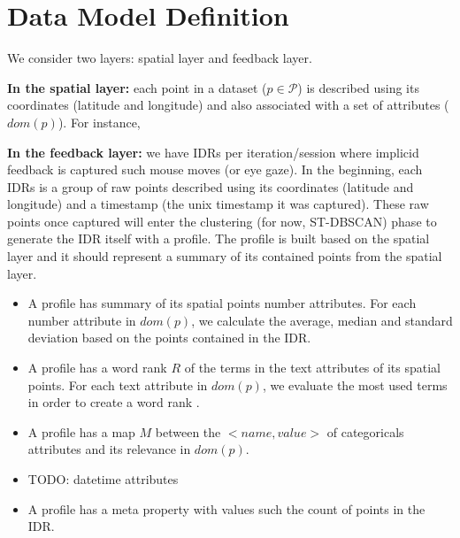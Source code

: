 \chapter{Data Model Definition}
\label{chap:model}

We consider two layers: spatial layer and feedback layer.

{\bf In the spatial layer:} each point in a dataset ($p \in \mathcal{P}$) is described using its coordinates (latitude and longitude) and also associated with a set of attributes ($dom(p)$). For instance, %

{\bf In the feedback layer:} we have IDRs per iteration/session where implicid feedback is captured such mouse moves (or eye gaze). In the beginning, each IDRs is a group of raw points described using its coordinates (latitude and longitude) and a timestamp (the unix timestamp it was captured). These raw points once captured will enter the clustering (for now, ST-DBSCAN) phase to generate the IDR itself with a profile. The profile is built based on the spatial layer and it should represent a summary of its contained points from the spatial layer.

\begin{itemize}
	\item A profile has summary of its spatial points number attributes. For each number attribute in $dom(p)$, we calculate the average, median and standard deviation based on the points contained in the IDR.

	\item A profile has a word rank $R$ of the terms in the text attributes of its spatial points. For each text attribute in $dom(p)$, we evaluate the most used terms in order to create a word rank \cite{kumarAndKaur}.

	\item A profile has a map $M$ between the $<name, value>$ of categoricals attributes and its relevance in $dom(p)$.

	\item TODO: datetime attributes

	\item A profile has a meta property with values such the count of points in the IDR.
\end{itemize}